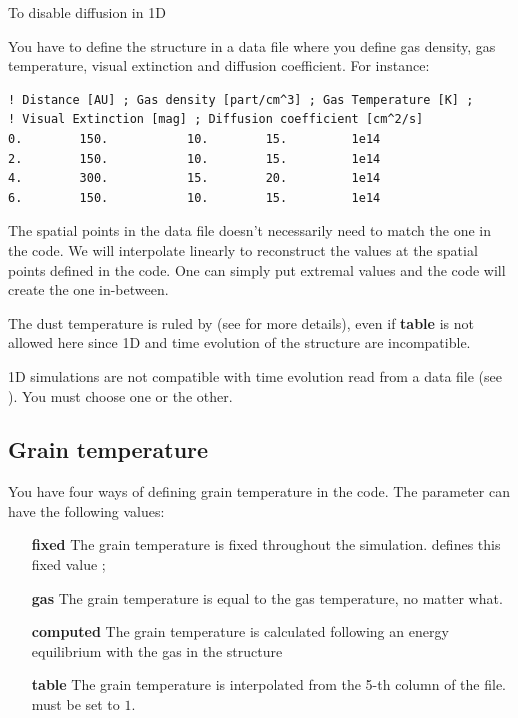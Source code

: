 \documentclass[english,a4paper,twoside]{article}
\begin{document}
To disable diffusion in 1D

You have to define the structure in a data file  where you define gas density, gas temperature, visual extinction and diffusion coefficient. For instance:
\begin{verbatim}
! Distance [AU] ; Gas density [part/cm^3] ; Gas Temperature [K] ; 
! Visual Extinction [mag] ; Diffusion coefficient [cm^2/s]
0.        150.           10.        15.         1e14
2.        150.           10.        15.         1e14
4.        300.           15.        20.         1e14
6.        150.           10.        15.         1e14
\end{verbatim}

The spatial points in the data file doesn't necessarily need to match the one in the code. We will interpolate linearly to reconstruct the values at the spatial points defined in the code. One can simply put extremal values and the code will create the one in-between. 

The dust temperature is ruled by  (see  for more details), even if \textbf{table} is not allowed here since 1D and time evolution of the structure are incompatible.

\begin{attention}
1D simulations are not compatible with time evolution read from a data file (see ). You must choose one or the other.
\end{attention}

\subsection{Grain temperature}\label{sec:dust_temp}
You have four ways of defining grain temperature in the code. The parameter  can have the following values:
\begin{itemize}
\item[\textbf{fixed}] The grain temperature is fixed throughout the simulation.  defines this fixed value ;
\item[\textbf{gas}] The grain temperature is equal to the gas temperature, no matter what.
\item[\textbf{computed}] The grain temperature is calculated following an energy equilibrium with the gas in the structure
\item[\textbf{table}] The grain temperature is interpolated from the 5-th column of the   file.  must be set to $1$.
\end{itemize}
\end{document}
